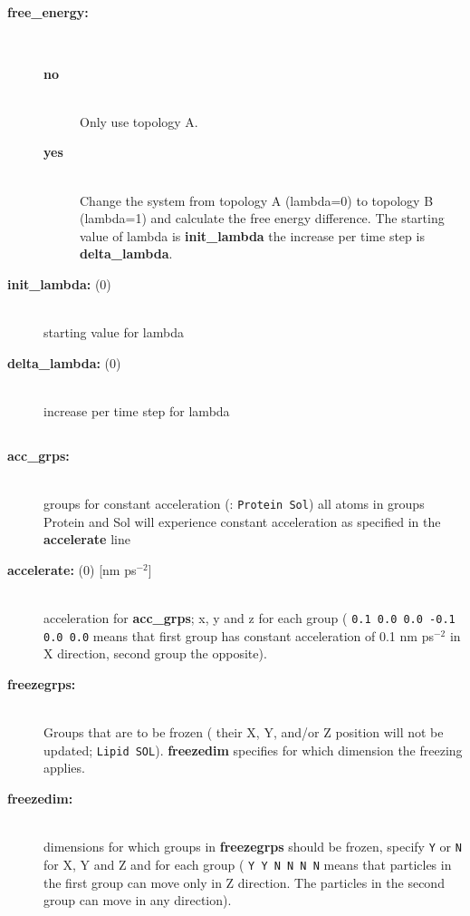 \subsection{}
\begin{description}
\item[{\bf free\_energy:}]\mbox{}\\
\vspace{-2ex}\begin{description}
\item[{\bf no}]\mbox{}\\
Only use topology A. 
\item[{\bf yes}]\mbox{}\\
Change the system from topology A (lambda=0) to topology B (lambda=1)
and calculate the free energy difference.
The starting value of lambda is {\bf init\_lambda} the increase
per time step is {\bf delta\_lambda}.
\end{description}
\item[{\bf init\_lambda: }(0)]\mbox{}\\
starting value for lambda
\item[{\bf delta\_lambda: }(0)]\mbox{}\\
increase per time step for lambda
\end{description}

\subsection{}
\begin{description}
\item[{\bf acc\_grps: }]\mbox{}\\
groups for constant acceleration ({\eg}: {\tt Protein Sol})
all atoms in groups Protein and Sol will experience constant acceleration
as specified in the {\bf accelerate} line
\item[{\bf accelerate: }(0) {[nm ps$^{-2}$]}]\mbox{}\\
acceleration for {\bf acc\_grps}; x, y and z for each group
({\eg} {\tt 0.1 0.0 0.0 -0.1 0.0 0.0} means that first group has constant 
acceleration of 0.1 nm ps$^{-2}$ in X direction, second group the 
opposite).
\item[{\bf freezegrps: }]\mbox{}\\
Groups that are to be frozen ({\ie} their X, Y, and/or Z position will
not be updated; {\eg} {\tt Lipid SOL}). {\bf freezedim} specifies for
which dimension the freezing applies.
\item[{\bf freezedim: }]\mbox{}\\
dimensions for which groups in {\bf freezegrps} should be frozen, 
specify {\tt Y} or {\tt N} for X, Y and Z and for each group
({\eg} {\tt Y Y N N N N} means that particles in the first group 
can move only in Z direction. The particles in the second group can 
move in any direction).
\end{description}

